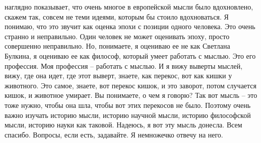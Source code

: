 наглядно показывает, что очень многое в европейской мысли было вдохновлено,
скажем так, совсем не теми идеями, которым бы стоило вдохноваться. Я понимаю,
что это звучит как оценка эпохи с позиции одного человека. Это очень странно и
неправильно. Один человек не может оценивать эпоху, просто совершенно
неправильно. Но, понимаете, я оцениваю ее не как Светлана Булкина, я оцениваю ее
как философ, который умеет работать с мыслью. Это его профессия. Моя профессия –
работать с мыслью. И я вижу выверты мыслей, вижу, где она идет, где этот выверт,
знаете, как перекос, вот как кишки у животного. Это самое, знаете, вот перекос
кишок, и это заворот, потом случается кишок, и животное умирает. Вы понимаете, о
чем я говорю? Так вот мысль – это тоже нужно, чтобы она шла, чтобы вот этих
перекосов не было. Поэтому очень важно изучать историю мысли, историю научной
мысли, историю философской мысли, историю науки как таковой. Надеюсь, я вот эту
мысль донесла. Всем спасибо. Вопросы, если есть, задавайте. Я немножечко отвечу
на него.
